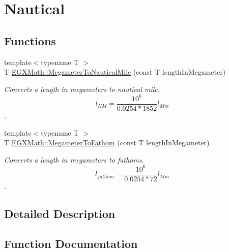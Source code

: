 \hypertarget{group___e_g_x_math-_conversions-_length_conversions-_megameter-_nautical}{}\section{Nautical}
\label{group___e_g_x_math-_conversions-_length_conversions-_megameter-_nautical}
\subsection*{Functions}
\begin{DoxyCompactItemize}
\item 
{\footnotesize template$<$typename T $>$ }\\T \mbox{\hyperlink{group___e_g_x_math-_conversions-_length_conversions-_megameter-_nautical_ga483b575b1654e1d0f6ea1fac63b5f54e}{E\+G\+X\+Math\+::\+Megameter\+To\+Nautical\+Mile}} (const T length\+In\+Megameter)
\begin{DoxyCompactList}\small\item\em Converts a length in megameters to nautical mile. \[ l_{NM}= \frac{10^{6}}{0.0254 * 1852} l_{Mm} \]. \end{DoxyCompactList}\item 
{\footnotesize template$<$typename T $>$ }\\T \mbox{\hyperlink{group___e_g_x_math-_conversions-_length_conversions-_megameter-_nautical_ga7149d3c252ab9459f8caad7b054f0601}{E\+G\+X\+Math\+::\+Megameter\+To\+Fathom}} (const T length\+In\+Megameter)
\begin{DoxyCompactList}\small\item\em Converts a length in megameters to fathoms. \[ l_{fathom}= \frac{10^{6}}{0.0254 * 72} l_{Mm} \]. \end{DoxyCompactList}\end{DoxyCompactItemize}


\subsection{Detailed Description}


\subsection{Function Documentation}
\mbox{\label{group___e_g_x_math-_conversions-_length_conversions-_megameter-_nautical_ga7149d3c252ab9459f8caad7b054f0601}} 
